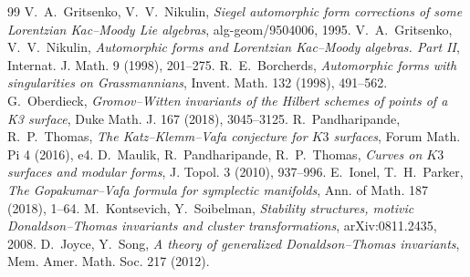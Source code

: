 \begin{thebibliography}{99}
 V.~A.~Gritsenko, V.~V.~Nikulin,
\emph{Siegel automorphic form corrections of some Lorentzian Kac--Moody Lie algebras}, alg-geom/9504006, 1995.
 V.~A.~Gritsenko, V.~V.~Nikulin,
\emph{Automorphic forms and Lorentzian Kac--Moody algebras. Part II}, Internat. J. Math. 9 (1998), 201--275.
 R.~E.~Borcherds,
\emph{Automorphic forms with singularities on Grassmannians}, Invent. Math. 132 (1998), 491--562.
 G.~Oberdieck,
\emph{Gromov--Witten invariants of the Hilbert schemes of points of a K3 surface}, Duke Math. J. 167 (2018), 3045--3125.
 R.~Pandharipande, R.~P.~Thomas,
\emph{The Katz--Klemm--Vafa conjecture for $K3$ surfaces}, Forum Math. Pi 4 (2016), e4.
 D.~Maulik, R.~Pandharipande, R.~P.~Thomas,
\emph{Curves on $K3$ surfaces and modular forms}, J. Topol. 3 (2010), 937--996.
 E.~Ionel, T.~H.~Parker,
\emph{The Gopakumar--Vafa formula for symplectic manifolds}, Ann. of Math. 187 (2018), 1--64.
 M.~Kontsevich, Y.~Soibelman,
\emph{Stability structures, motivic Donaldson--Thomas invariants and cluster transformations}, arXiv:0811.2435, 2008.
 D.~Joyce, Y.~Song,
\emph{A theory of generalized Donaldson--Thomas invariants}, Mem. Amer. Math. Soc. 217 (2012).
\end{thebibliography}
